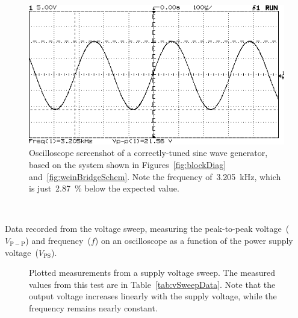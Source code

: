 \begin{figure}[H]
	\centering
	\includegraphics[width=.6\textwidth]{img/shot/pt2shot.png}
	\parbox{.6\textwidth}{
	\caption[Oscilloscope Screenshot --- Functioning System]{Oscilloscope
	screenshot of a correctly-tuned sine wave generator, based on the system
	shown in Figures~\ref{fig:blockDiag} and~\ref{fig:weinBridgeSchem}.  Note
	the frequency of~\SI{3.205}{\kilo\hertz}, which is just~\SI{2.87}{\percent}
	below the expected value.}
	\label{fig:goodShot}}
\end{figure}


\begin{table}[H]
	\centering
	\\
	\parbox{.6\textwidth}{
	\caption[Voltage Sweep Data]{Data recorded from the voltage sweep,
		measuring the peak-to-peak voltage~($V_\mathrm{P-P}$) and
		frequency~($f$) on an oscilloscope as a function of the power supply
		voltage~($V_\mathrm{PS}$).}
	\label{tab:vSweepData}}
\end{table}
\begin{figure}[H]
	\centering
	
	\parbox{4.25in}{
	\caption[Voltage Sweep Plot]{Plotted measurements from a supply voltage
	sweep.  The measured values from this test are in
	Table~\ref{tab:vSweepData}.  Note that the output voltage increases
	linearly with the supply voltage, while the frequency remains nearly
	constant.}
	\label{fig:vSweepPlots}}
\end{figure}




